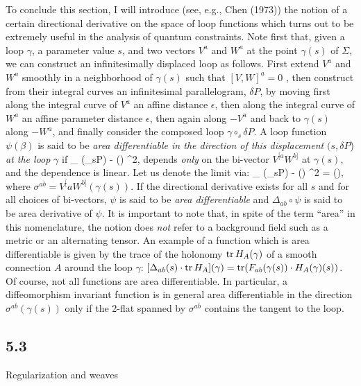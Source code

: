 To conclude this section, I will introduce (see, e.g., Chen (1973))
the notion of a certain directional derivative on the space of loop
functions which turns out to be extremely useful in the analysis of
quantum constraints. Note first that, given a loop $\gamma$, a parameter
value $s$, and two vectors $V^a$ and $W^a$ at the point $\gamma(s)$ of
$\Sigma$, we can construct an infinitesimally displaced loop as follows.
First extend $V^a$ and $W^a$ smoothly in a neighborhood of $\gamma(s)$ such
that $[V, W]^a = 0$ , then construct from their integral curves an
infinitesimal parallelogram, $\delta P$, by moving first along the integral
curve of $V^a$ an affine distance $\epsilon$, then along the integral curve
of $W^a$ an affine parameter distance $\epsilon$, then again along $-V^a$ and
back to $\gamma(s)$ along $-W^a$, and finally consider the composed loop
$\gamma\circ_s \delta P$. A loop function $\psi(\beta)$
is said to be {\it area differentiable in the direction of this displacement}
$(s, \delta P$) {\it at the loop} $\gamma$ if
\bneq
\lim_{\epsilon{}} {{\psi(\gamma\circ_s\delta P) - \psi (\gamma)}\over
\epsilon^2}\quad{},
depends {\it only} on the bi-vector $V^{[a}W^{b]}$ at $\gamma(s)$, and the
dependence is linear. Let us denote the limit via:
\bneq
\lim_{\epsilon{}} {{\psi(\gamma\circ_s\delta P) - \psi (\gamma)}\over
\epsilon^2} = \- 
(\gamma ),
where $\sigma^{ab} = V^{[}a W^{b]}(\gamma(s))$. If the
directional derivative exists for all $s$ and for all choices of bi-vectors,
$\psi$ is said to be {\it area differentiable} and $\Delta_{ab}\circ
\psi$ is said to be area derivative of $\psi$. It is important to note
that, in spite of the term ``area'' in this nomenclature, the notion does
{\it not} refer to a background field such as a metric or an alternating
tensor. An example of a function which is area differentiable is given
by the trace of the holonomy $\mathop{\rm tr} H_A (\gamma)$ of a smooth connection $A$
around the loop $\gamma$: $[\Delta_{ab}(s)\cdot \mathop{\rm tr} H_A](\gamma) = \mathop{\rm tr}
(F_{ab}(\gamma(s))\cdot H_A(\gamma )(s))$. Of course, not all functions are
area differentiable. In particular, a diffeomorphism invariant function is
in general area differentiable in the direction $\sigma^{ab}(\gamma(s))$ only
if the 2-flat spanned by $\sigma^{ab}$ contains the tangent to the loop.

\goodbreak
\subsection{5.3}{Regularization and weaves}%

